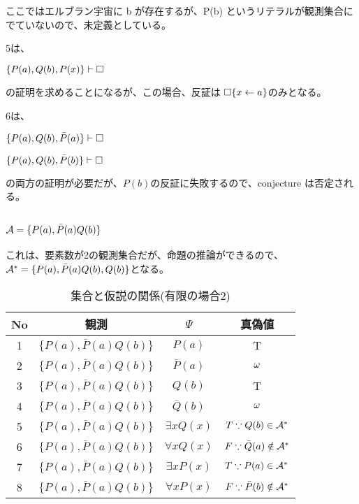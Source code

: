 \documentclass[10pt, oneside]{jarticle}   	%
\begin{document}
ここではエルブラン宇宙に b が存在するが、P(b) というリテラルが観測集合にでていないので、未定義としている。

5は、

$\{{P(a), Q(b), P(x)}\} \vdash \Box$ 

の証明を求めることになるが、この場合、反証は $\Box\{x \leftarrow a\}$のみとなる。

6は、

$\{P(a), Q(b), \bar P(a)\} \vdash \Box$

$\{P(a), Q(b), \bar P(b)\} \vdash \Box$

の両方の証明が必要だが、$P(b)$の反証に失敗するので、conjecture は否定される。


\subsection{$\mathcal{A}=\{{P(a), \bar P(a)Q(b)}\}$}

これは、要素数が2の観測集合だが、命題の推論ができるので、$\mathcal{A}^{*}=\{{P(a), \bar P(a)Q(b), Q(b)}\}$となる。

\begin{table}[htbp]
 \centering
 \begin{tabular}{|c|c|c|c|}\hline
   No & 観測 & $\Psi$ & 真偽値 \\ \hline
   1 & $\{P(a), \bar{P}(a)Q(b)\}$ & $P(a)$ & T \\ \hline
   2 & $\{P(a), \bar P(a)Q(b)\}$ & $\bar P(a)$ & $\omega$ \\ \hline %
   3 & $\{P(a), \bar P(a)Q(b)\}$ & $Q(b)$ & T \\ \hline
   4 & $\{P(a), \bar P(a)Q(b)\}$ & $\bar Q(b)$ & $\omega$ \\ \hline  %
   5 & $\{P(a), \bar P(a)Q(b)\}$ & $\exists x Q(x)$ & $T \because Q(b) \in \mathcal{A}^{*}$ \\ \hline
   6 & $\{P(a), \bar P(a)Q(b)\}$ & $\forall x Q(x)$ & $F \because  \bar Q(a) \notin \mathcal{A}^{*}$ \\ \hline
   7 & $\{P(a), \bar P(a)Q(b)\}$ & $\exists x P(x)$ & $T \because P(a) \in \mathcal{A}^{*}$ \\ \hline
   8 & $\{P(a), \bar P(a)Q(b)\}$ & $\forall x P(x)$ & $F \because \bar P(b) \notin \mathcal{A}^{*}$ \\ \hline
 \end{tabular}
 \caption{集合と仮説の関係(有限の場合2)}
 \label{tab:ex0104}
\end{table}

\end{document}

